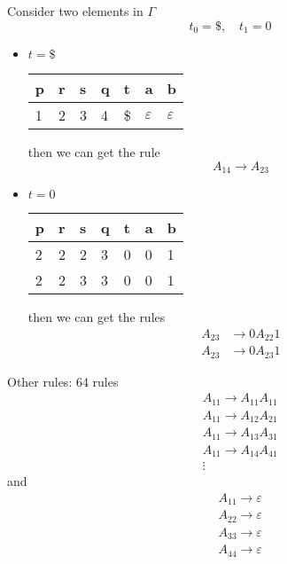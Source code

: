 Consider two elements in \(\Gamma\)
\[
    t_0 = \$, \quad t_1 = 0
\]
\begin{itemize}
    \item $t=\$$
    \begin{center}
    \begin{tabular}{lllllll}
        p & r & s & q & t & a & b\\ \hline
        1 & 2 & 3 & 4 & \$ & $\varepsilon$ & $\varepsilon$
    \end{tabular}
    \end{center}
    then we can get the rule
    \[
        A_{14} \to A_{23}
    \]
    \newpage
    \item $t=0$
    \begin{center}
    \begin{tabular}{lllllll}
        p & r & s & q & t & a & b\\ \hline
        2 & 2 & 2 & 3 & 0 & 0 & 1\\
        2 & 2 & 3 & 3 & 0 & 0 & 1\\
    \end{tabular}
    \end{center}
    then we can get the rules
    \begin{align*}
        A_{23} &\to 0 A_{22} 1 \\
        A_{23} &\to 0 A_{23} 1
    \end{align*}
\end{itemize}

Other rules: 64 rules
\begin{eqnarray*}
&&A_{11}\rightarrow A_{11}A_{11}\\
&&A_{11}\rightarrow A_{12}A_{21}\\
&&A_{11}\rightarrow A_{13}A_{31}\\
&&A_{11}\rightarrow A_{14}A_{41}\\
&&\vdots
\end{eqnarray*}
and
\begin{eqnarray*}
&& A_{11}\rightarrow \varepsilon \\  
&& A_{22}\rightarrow \varepsilon \\
&& A_{33}\rightarrow \varepsilon \\
&& A_{44}\rightarrow \varepsilon 
\end{eqnarray*}

